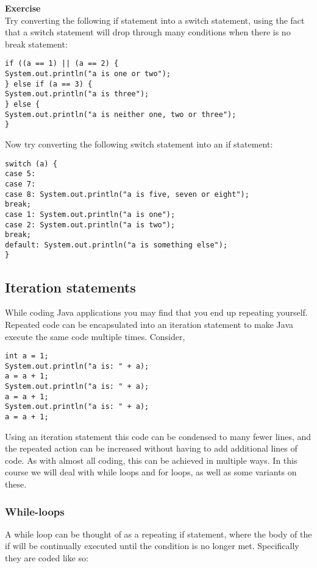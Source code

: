 \noindent
{\bf Exercise}\\

\noindent
Try converting the following if statement into a switch statement, using the fact that a switch statement will drop through many conditions when there is no break statement:

\begin{verbatim}
if ((a == 1) || (a == 2) {
System.out.println("a is one or two");
} else if (a == 3) {
System.out.println("a is three");
} else {
System.out.println("a is neither one, two or three");
}
\end{verbatim}

\noindent
Now try converting the following switch statement into an if statement:

\begin{verbatim}
switch (a) {
case 5:
case 7:
case 8: System.out.println("a is five, seven or eight");
break;
case 1: System.out.println("a is one");
case 2: System.out.println("a is two");
break;
default: System.out.println("a is something else");
}
\end{verbatim}

\subsection{Iteration statements}

While coding Java applications you may find that you end up repeating yourself. Repeated code can be encapsulated into an iteration statement to make Java execute the same code multiple times. Consider,

\begin{verbatim}
int a = 1;
System.out.println("a is: " + a);
a = a + 1;
System.out.println("a is: " + a);
a = a + 1;
System.out.println("a is: " + a);
a = a + 1;
\end{verbatim}

\noindent
Using an iteration statement this code can be condensed to many fewer lines, and the repeated action can be increased without having to add additional lines of code. As with almost all coding, this can be achieved in multiple ways. In this course we will deal with while loops and for loops, as well as some variants on these.

\subsubsection*{While-loops}

A while loop can be thought of as a repeating if statement, where the body of the if will be continually executed until the condition is no longer met. Specifically they are coded like so:

